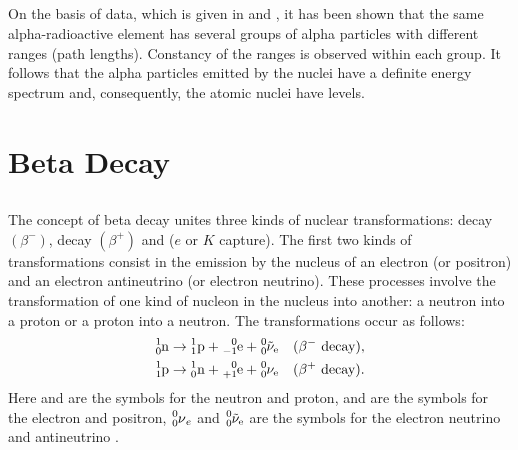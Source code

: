 \subsection{}\label{42.5.5} On the basis of data, which is given in  and , it has been shown that the same alpha-radioactive element has several groups of alpha particles with different ranges (path lengths). Constancy of the ranges is observed within each group. It follows that the alpha particles emitted by the nuclei have a definite energy spectrum and, consequently,
the atomic nuclei have  levels.

\section{Beta Decay}
\label{sec-42.6} 

\subsection{}\label{42.6.1} The concept of beta decay unites three kinds of nuclear transformations:  decay $(\beta^{-})$,  decay $(\beta^{+})$ and  ($e$ or $K$ capture). The first two kinds of transformations consist in the emission by the nucleus of an electron (or positron) and an electron antineutrino (or electron neutrino). These processes involve the transformation of one kind of nucleon in the nucleus into another: a neutron into a proton or a proton into a neutron. The transformations occur as follows:
\begin{align*}%
\ce{^{1}_{0}{n} & \to ^{1}_{1}{p} + ^{0}_{-1}{e} + ^{0}_{0}{\tilde{\nu}_e}} && (\beta^{-} \text{ decay}),\\
\ce{^{1}_{1}{p} & \to ^{1}_{0}{n} + ^{0}_{+1}{e} + ^{0}_{0}{{\nu}_e}} && (\beta^{+} \text{ decay}).
\end{align*}
Here  and  are the symbols for the neutron and proton,  and  are the symbols for the electron and positron,  $\ce{^{0}_{0}\nu_{e}}$ and $\ce{^{0}_{0}{\tilde{\nu}_{e}}}$ 
 are the symbols for the electron neutrino and antineutrino .
 
